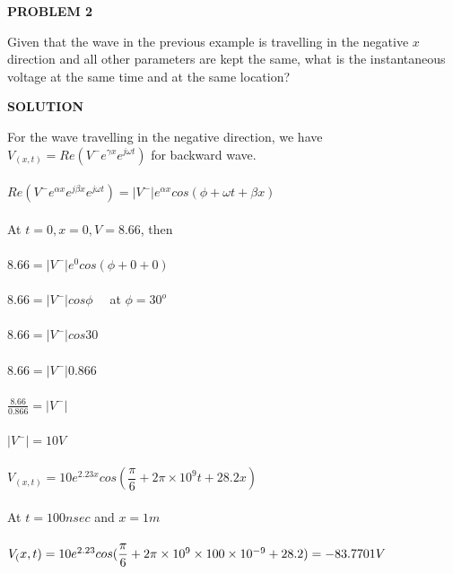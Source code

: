 \begin{center}
\textbf{PROBLEM 2}
\end{center}
Given that the wave in the previous example is travelling in the negative ${x}$ direction and all other parameters are kept the same, what is the instantaneous voltage at the same time and at the same location?\\
\begin{center}
\textbf{SOLUTION}
\end{center}
For the wave travelling in the negative direction, we have\\
$V_{(x,t)} = Re(V^{-}e^{\gamma x}e^{j\omega t})$ for backward wave.\\\\
$Re({V^{-}e^{\alpha x}e^{j\beta x}e^{j\omega t}}) = {|V^{-}|e^{\alpha x}cos{(\phi+\omega t + \beta x)}}$\\\\
At ${t=0, x=0, V=8.66}$, then\\\\
${8.66} = {|V^{-}|}e^{0} cos({\phi + 0 + 0})$\\\\
$8.66 = {|V^-|{cos\phi}} \quad$ at $ \phi = 30^{o} $\\\\
$8.66 = {|V^-|{cos30}}$\\\\
$8.66 = {|V^-|{0.866}}$\\\\
$\frac{8.66}{0.866} = {|V^-|}$\\\\
${|V^{-}|} = 10V$\\\\
$V_({x,t}) = 10e^{2.23x} cos({\dfrac{\pi}{6} + 2\pi\times10^9t + 28.2x})$\\\\
At ${t=100nsec}$ and ${x=1m}$\\\\
$V_({x,t}) = 10e^{2.23} cos({\dfrac{\pi}{6} + 2\pi\times10^9\times100\times10^{-9} + 28.2})\\\\
= -83.7701V$\\\\
